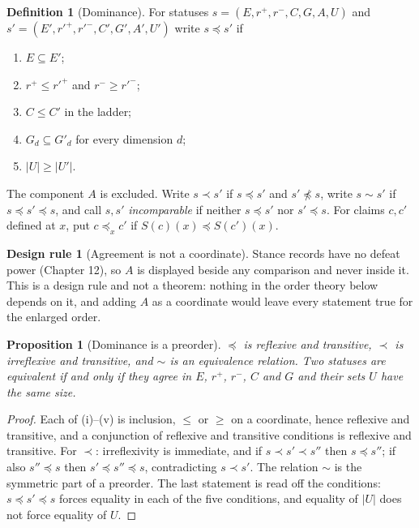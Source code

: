\documentclass[11pt]{article}
\theoremstyle{plain}
\newtheorem{proposition}[theorem]{Proposition}
\theoremstyle{definition}
\newtheorem{definition}[theorem]{Definition}
\newtheorem{designrule}[theorem]{Design rule}
\theoremstyle{remark}
\begin{document}
\begin{definition}[Dominance]\label{def:dominance}
For statuses $s=(E,r^+,r^-,C,G,A,U)$ and $s'=(E',r'^+,r'^-,C',G',A',U')$ write $s\preceq s'$ if
\begin{enumerate}[label=(\roman*),nosep]
\item $E\subseteq E'$;
\item $r^+\le r'^+$ and $r^-\ge r'^-$;
\item $C\le C'$ in the ladder;
\item $G_d\subseteq G'_d$ for every dimension $d$;
\item $|U|\ge|U'|$.
\end{enumerate}
The component $A$ is excluded. Write $s\prec s'$ if $s\preceq s'$ and $s'\not\preceq s$, write $s\sim s'$ if $s\preceq s'\preceq s$, and call $s,s'$ \emph{incomparable} if neither $s\preceq s'$ nor $s'\preceq s$. For claims $c,c'$ defined at $x$, put $c\preceq_x c'$ if $S(c)(x)\preceq S(c')(x)$.
\end{definition}

\begin{designrule}[Agreement is not a coordinate]\label{rule:noagree}
Stance records have no defeat power (Chapter 12), so $A$ is displayed beside any comparison and never inside it. This is a design rule and not a theorem: nothing in the order theory below depends on it, and adding $A$ as a coordinate would leave every statement true for the enlarged order.
\end{designrule}

\begin{proposition}[Dominance is a preorder]\label{prop:preorder}
$\preceq$ is reflexive and transitive, $\prec$ is irreflexive and transitive, and $\sim$ is an equivalence relation. Two statuses are equivalent if and only if they agree in $E$, $r^+$, $r^-$, $C$ and $G$ and their sets $U$ have the same size.
\end{proposition}

\begin{proof}
Each of (i)--(v) is inclusion, $\le$ or $\ge$ on a coordinate, hence reflexive and transitive, and a conjunction of reflexive and transitive conditions is reflexive and transitive. For $\prec$: irreflexivity is immediate, and if $s\prec s'\prec s''$ then $s\preceq s''$; if also $s''\preceq s$ then $s'\preceq s''\preceq s$, contradicting $s\prec s'$. The relation $\sim$ is the symmetric part of a preorder. The last statement is read off the conditions: $s\preceq s'\preceq s$ forces equality in each of the five conditions, and equality of $|U|$ does not force equality of $U$.
\end{proof}
\end{document}
